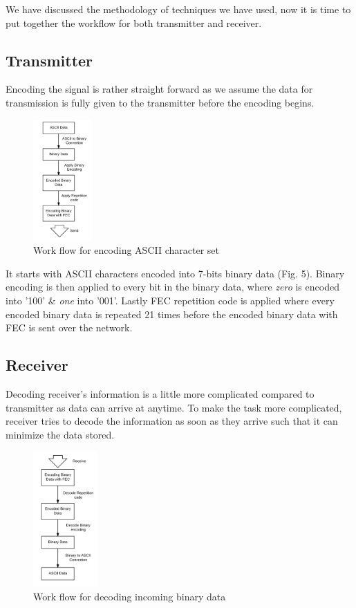 \documentclass[letterpaper, 10 pt, conference]{ieeeconf}  %
\begin{document}
We have discussed the methodology of techniques we have used, now it is time to put together the workflow for both transmitter and receiver.

\subsection{Transmitter}

Encoding the signal is rather straight forward as we assume the data for transmission is fully given to the transmitter before the encoding begins. 

\begin{figure}[h!]
  \centering
  \includegraphics[width=0.2\textwidth]{Encode.png}
  \caption{Work flow for encoding ASCII character set}
\end{figure}

It starts with ASCII characters encoded into 7-bits binary data (Fig. 5). Binary encoding is then applied to every bit in the binary data, where \textit{zero} is encoded into '100' \& \textit{one} into '001'. Lastly FEC repetition code is applied where every encoded binary data is repeated 21 times before the encoded binary data with FEC is sent over the network.


\subsection{Receiver}

Decoding receiver's information is a little more complicated compared to transmitter as data can arrive at anytime. To make the task more complicated, receiver tries to decode the information as soon as they arrive such that it can minimize the data stored. 

\begin{figure}[h!]
  \centering
  \includegraphics[width=0.22\textwidth]{Decode.png}
  \caption{Work flow for decoding incoming binary data}
\end{figure}
\end{document}
